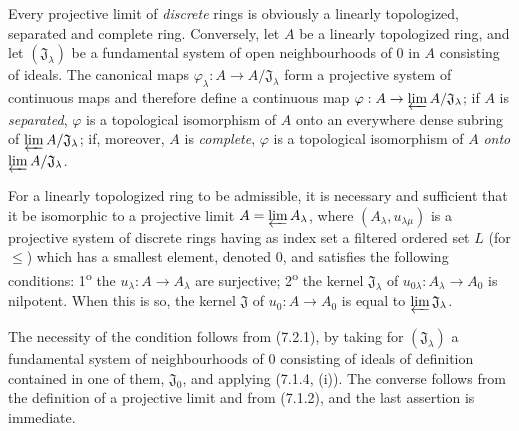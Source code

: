 \begin{env}[7.2.1]
\label{0.7.2.1}
Every projective limit of \emph{discrete} rings is obviously a linearly
topologized, separated and complete ring. Conversely, let $A$ be a linearly
topologized ring, and let $(\mathfrak J_\lambda)$ be a fundamental system
of open neighbourhoods of $0$ in $A$ consisting
of ideals. The canonical maps
$\varphi_\lambda:A\to A/\mathfrak J_\lambda$ form a projective system of
continuous maps and therefore define a continuous map
$\varphi:A\to\varprojlim A/\mathfrak J_\lambda$; if $A$ is \emph{separated},
$\varphi$ is a topological isomorphism of $A$ onto an
everywhere dense subring of $\varprojlim A/\mathfrak J_\lambda$; if,
moreover, $A$ is \emph{complete}, $\varphi$ is a topological isomorphism of $A$ \emph{onto}
$\varprojlim A/\mathfrak J_\lambda$.
\end{env}

\begin{lemma}[7.2.2]
\label{0.7.2.2}
For a linearly topologized ring to be admissible, it is necessary and sufficient
that it be isomorphic to a projective limit
$A=\varprojlim A_\lambda$, where $(A_\lambda,u_{\lambda\mu})$ is a
projective system of discrete rings having as index set a filtered ordered
set $L$ (for $\leq$) which has a smallest element, denoted $0$, and satisfies
the following conditions: 1\textsuperscript{o} the
$u_\lambda:A\to A_\lambda$ are surjective; 2\textsuperscript{o} the kernel
$\mathfrak J_\lambda$ of $u_{0\lambda}:A_\lambda\to A_0$ is nilpotent.
When this is so, the kernel $\mathfrak J$ of $u_0:A\to A_0$ is equal to
$\varprojlim\mathfrak J_\lambda$.
\end{lemma}

The necessity of the condition follows from (7.2.1), by taking for
$(\mathfrak J_\lambda)$ a fundamental system of neighbourhoods of $0$ consisting
of ideals of definition contained in one of them, $\mathfrak J_0$, and applying
(7.1.4, (i)). The converse follows from the definition of a projective limit and
from (7.1.2), and the last assertion is immediate.

